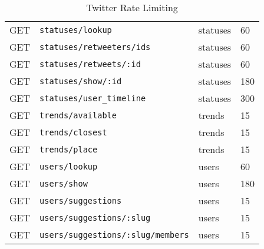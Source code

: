 \begin{table}[h]
\begin{tabular}{l | l | l | l}
GET & \verb|statuses/lookup| & statuses & 60 \\
GET & \verb|statuses/retweeters/ids| & statuses & 60 \\
GET & \verb|statuses/retweets/:id| & statuses & 60 \\
GET & \verb|statuses/show/:id| & statuses & 180 \\
GET & \verb|statuses/user_timeline| & statuses & 300 \\
GET & \verb|trends/available| & trends & 15 \\
GET & \verb|trends/closest| & trends & 15 \\
GET & \verb|trends/place| & trends & 15 \\
GET & \verb|users/lookup| & users & 60 \\
GET & \verb|users/show| & users & 180 \\
GET & \verb|users/suggestions| & users & 15 \\
GET & \verb|users/suggestions/:slug| & users & 15 \\
GET & \verb|users/suggestions/:slug/members| & users & 15  \\
\end{tabular}
\caption{Twitter Rate Limiting}
\label{tab:abc}
\end{table}


